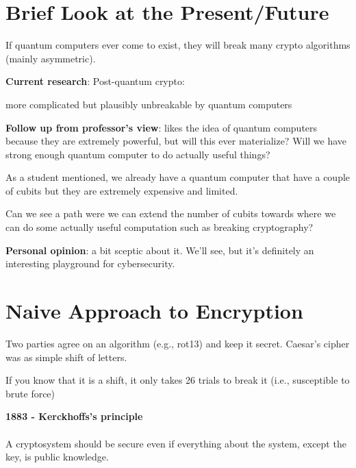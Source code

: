 \documentclass[11pt]{article}
\begin{document}
\section*{Brief Look at the Present/Future}

If quantum computers ever come to exist, they will break many crypto algorithms (mainly asymmetric). 

\textbf{Current research}: Post-quantum crypto: 

more complicated but plausibly unbreakable by quantum computers

\textbf{Follow up from professor's view}: likes the idea of quantum computers because they are extremely powerful, but will this ever materialize? Will we have strong enough quantum computer to do actually useful things? 

As a student mentioned, we already have a quantum computer that have a couple of cubits but they are extremely expensive and limited. 

Can we see a path were we can extend the number of cubits towards where we can do some actually useful computation such as breaking cryptography? 

\textbf{Personal opinion}: a bit sceptic about it. We'll see, but it's definitely an interesting playground for cybersecurity.

\section*{Naive Approach to Encryption}

Two parties agree on an algorithm (e.g., rot13) and keep it secret. Caesar's cipher was as simple shift of letters.

If you know that it is a shift, it only takes 26 trials to break it (i.e., susceptible to brute force) 

\begin{tcolorbox}[
  colback=yellow!15,     %
  colframe=black!50,    %
  boxrule=1pt,       %
  arc=3mm,             %
  left=4mm, right=4mm, top=2mm, bottom=2mm %
]
\textbf{1883 - \textbf{Kerckhoffs's principle}} \\

\\

A cryptosystem should be secure even if everything about the system, except the key, is public knowledge. 
\end{tcolorbox}
\end{document}
